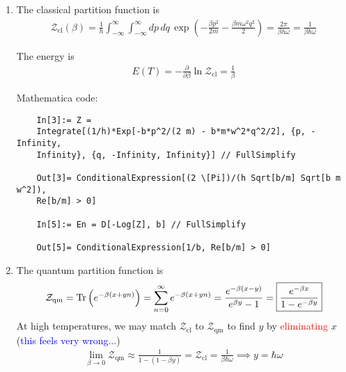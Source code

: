 \documentclass{article}
\theoremstyle{definition}
\newcommand{\p}{\partial}
\newcommand{\be}{\beta}
\newcommand{\f}[2]{\frac{#1}{#2}}
\newcommand{\lp}{\left(}
\newcommand{\rp}{\right)}
\begin{document}
\begin{enumerate}[label=(\alph*)]
	\item The classical partition function is 
	\begin{align*}
	\mathcal{Z}_\text{cl}(\be) = \f{1}{h}\int^\infty_{-\infty}\int^\infty_{-\infty}  dp\,dq\, \exp\lp -\f{\be p^2}{2m} - \f{\be m \omega^2 q^2}{2} \rp =  \f{2\pi}{\be h\omega} = \boxed{\f{1}{\be \hbar \omega}}
	\end{align*}

	
	The energy is 
	\begin{align*}
	E(T) = -\f{\p }{\p \be} \ln \mathcal{Z}_\text{cl} = \boxed{\f{1}{\be}}
	\end{align*}
	
	Mathematica code:
	\begin{lstlisting}
	In[3]:= Z = 
	Integrate[(1/h)*Exp[-b*p^2/(2 m) - b*m*w^2*q^2/2], {p, -Infinity, 
	Infinity}, {q, -Infinity, Infinity}] // FullSimplify
	
	Out[3]= ConditionalExpression[(2 \[Pi])/(h Sqrt[b/m] Sqrt[b m w^2]), 
	Re[b/m] > 0]
	
	In[5]:= En = D[-Log[Z], b] // FullSimplify
	
	Out[5]= ConditionalExpression[1/b, Re[b/m] > 0]
	\end{lstlisting}
	
	\item The quantum partition function is 
	\begin{align*}
	\mathcal{Z}_\text{qm} = \Tr\lp e^{-\be(x+yn)} \rp = \sum_{n=0}^\infty e^{-\be(x+yn)} = {\f{e^{-\be(x-y)}}{e^{\be y} - 1} } = \boxed{\f{e^{-\be x}}{ 1 - e^{-\be y}}}
	\end{align*}
	At high temperatures, we may match $\mathcal{Z}_\text{cl}$ to $\mathcal{Z}_\text{qm}$ to find $y$ by \textcolor{red}{eliminating} $x$ (\textcolor{blue}{this feels very wrong...})
	\begin{align*}
	\lim_{\be \to 0} \mathcal{Z}_\text{qm} \approx \f{1}{ 1 - (1- \be y)} = \mathcal{Z}_\text{cl} = \f{1}{\be \hbar \omega} \implies \boxed{y = \hbar \omega} 
	\end{align*}

	
	

\end{enumerate}
\end{document}
